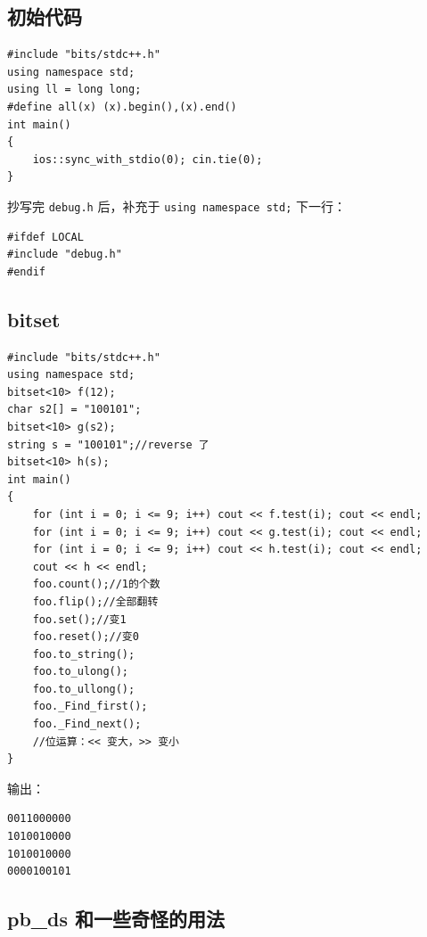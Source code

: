 \documentclass[12pt]{ctexart}
\begin{document}
\subsection{初始代码}

\begin{lstlisting}
#include "bits/stdc++.h"
using namespace std;
using ll = long long;
#define all(x) (x).begin(),(x).end()
int main()
{
	ios::sync_with_stdio(0); cin.tie(0);
}
\end{lstlisting}

抄写完 \verb|debug.h| 后，补充于 \verb|using namespace std;| 下一行：

\begin{lstlisting}
#ifdef LOCAL
#include "debug.h"
#endif
\end{lstlisting}


\subsection{bitset}

\begin{lstlisting}
#include "bits/stdc++.h"
using namespace std;
bitset<10> f(12);
char s2[] = "100101";
bitset<10> g(s2);
string s = "100101";//reverse 了
bitset<10> h(s);
int main()
{
	for (int i = 0; i <= 9; i++) cout << f.test(i); cout << endl;
	for (int i = 0; i <= 9; i++) cout << g.test(i); cout << endl;
	for (int i = 0; i <= 9; i++) cout << h.test(i); cout << endl;
	cout << h << endl;
	foo.count();//1的个数
	foo.flip();//全部翻转
	foo.set();//变1
	foo.reset();//变0
	foo.to_string();
	foo.to_ulong();
	foo.to_ullong();
	foo._Find_first();
	foo._Find_next();
	//位运算：<< 变大，>> 变小
}

\end{lstlisting}

输出：

\begin{verbatim}
0011000000
1010010000
1010010000
0000100101
\end{verbatim}

\subsection{pb\_ds 和一些奇怪的用法}
\end{document}
